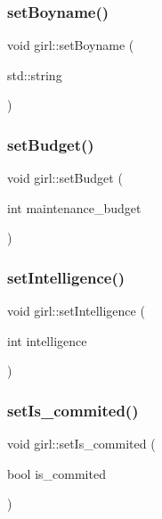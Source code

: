 \mbox{\label{classgirl_a761660d73115bf5940576daab5719aff}} 
\subsubsection{\texorpdfstring{set\+Boyname()}{setBoyname()}}
{\footnotesize\ttfamily void girl\+::set\+Boyname (\begin{DoxyParamCaption}\item[{std\+::string}]{ }\end{DoxyParamCaption})}

\mbox{\label{classgirl_aabb69c46aef35ff020d90d3b28300f98}} 
\subsubsection{\texorpdfstring{set\+Budget()}{setBudget()}}
{\footnotesize\ttfamily void girl\+::set\+Budget (\begin{DoxyParamCaption}\item[{int}]{maintenance\+\_\+budget }\end{DoxyParamCaption})}

\mbox{\label{classgirl_a3a4c341525032ef1a9a43572ab4ab370}} 
\subsubsection{\texorpdfstring{set\+Intelligence()}{setIntelligence()}}
{\footnotesize\ttfamily void girl\+::set\+Intelligence (\begin{DoxyParamCaption}\item[{int}]{intelligence }\end{DoxyParamCaption})}

\mbox{\label{classgirl_aa02816fb19d2f81683b5fe75729eacb1}} 
\subsubsection{\texorpdfstring{set\+Is\+\_\+commited()}{setIs\_commited()}}
{\footnotesize\ttfamily void girl\+::set\+Is\+\_\+commited (\begin{DoxyParamCaption}\item[{bool}]{is\+\_\+commited }\end{DoxyParamCaption})}

